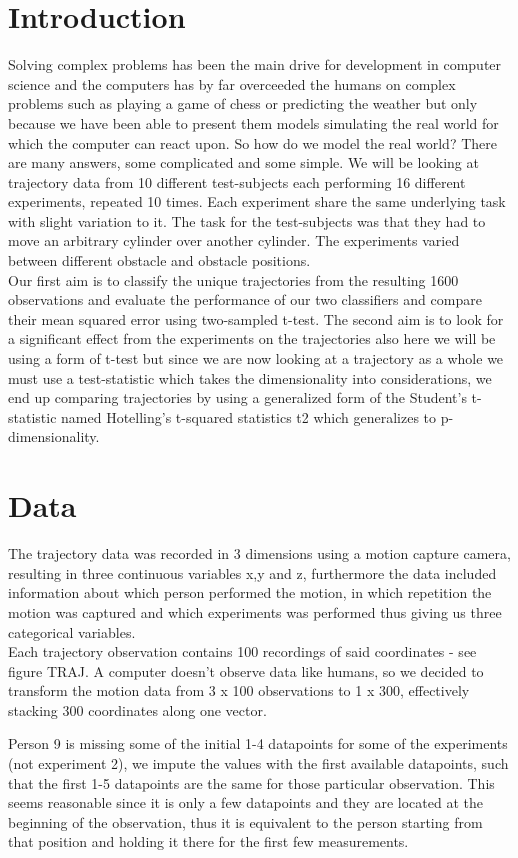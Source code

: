 \documentclass{article}
\begin{document}
\section{Introduction}
Solving complex problems has been the main drive for development in computer science and the computers has by far overceeded the humans on complex problems such as playing a game of chess or predicting the weather but only because we have been able to present them models simulating the real world for which the computer can react upon. So how do we model the real world? There are many answers, some complicated and some simple. We will be looking at trajectory data from 10 different test-subjects each performing 16 different experiments, repeated 10 times. Each experiment share the same underlying task with slight variation to it. The task for the test-subjects was that they had to move an arbitrary cylinder over another cylinder. The experiments varied between different obstacle and obstacle positions. \\ Our first aim is to classify the unique trajectories from the resulting 1600 observations and evaluate the performance of our two classifiers and compare their mean squared error using two-sampled t-test. The second aim is to look for a significant effect from the experiments on the trajectories also here we will be using a form of t-test but since we are now looking at a trajectory as a whole we must use a test-statistic which takes the dimensionality into considerations, we end up comparing trajectories by using a generalized form of the Student's t-statistic named Hotelling's t-squared statistics t2 which generalizes to p-dimensionality.


\section{Data}
The trajectory data was recorded in 3 dimensions using a motion capture camera, resulting in three continuous variables x,y and z, furthermore the data included information about which person performed the motion, in which repetition the motion was captured and which experiments was performed thus giving us three categorical variables. \\ Each trajectory observation contains 100 recordings of said coordinates - see figure TRAJ.
A computer doesn't observe data like humans, so we decided to transform the motion data from 3 x 100 observations to 1 x 300, effectively stacking 300 coordinates along one vector.

Person 9 is missing some of the initial 1-4 datapoints for some of the experiments (not experiment 2), 
we impute the values with the first available datapoints, such that the first 1-5 datapoints are the same for those particular observation. This seems reasonable since it is only a few datapoints and they are located at the beginning of the observation, thus it is equivalent to the person starting from that position and holding it there for the first few measurements.
\end{document}

